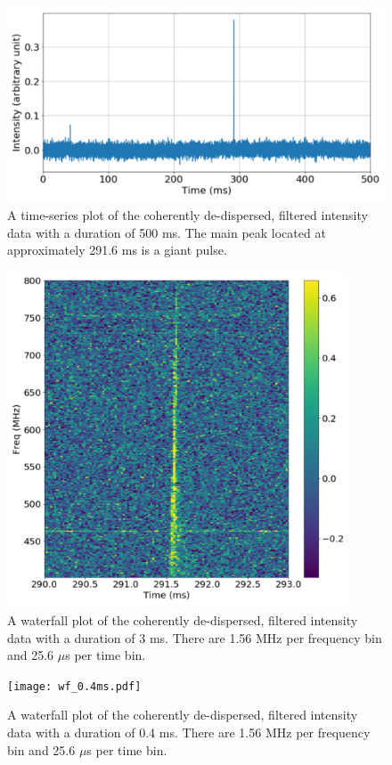 \documentclass{article}
\begin{document}
\begin{figure}[h!]
  \centering
  \includegraphics[width=1.0\textwidth]{ts_500ms.pdf}
  \caption{A time-series plot of the coherently de-dispersed, filtered intensity data with a duration of 500 ms. The main peak located at approximately 291.6 ms is a giant pulse.}
  \label{fig:ts}
\end{figure}
\begin{figure}[H]
  \centering
  \includegraphics[width=0.9\textwidth]{wf_3ms.pdf}
  \caption{A waterfall plot of the coherently de-dispersed, filtered intensity data with a duration of 3 ms. There are 1.56 MHz per frequency bin and 25.6 $\mu$s per time bin.}
  \label{fig:wf1}
\end{figure}
\begin{figure}[H]
  \centering
  \texttt{[image: wf\_0.4ms.pdf]}
  \caption{A waterfall plot of the coherently de-dispersed, filtered intensity data with a duration of 0.4 ms. There are 1.56 MHz per frequency bin and 25.6 $\mu$s per time bin.}
  \label{fig:wf2}
\end{figure}
\\
\end{document}
